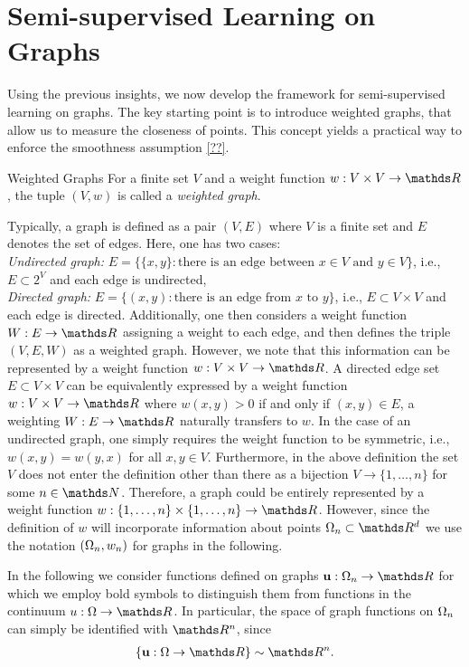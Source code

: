 \section{Semi-supervised Learning on Graphs}\label{sec:SSL_Graphs}
%
Using the previous insights, we now develop the framework for semi-supervised 
learning on graphs. The key starting point is to introduce weighted graphs, that allow 
us to measure the closeness of points. This concept yields a practical way to 
enforce the smoothness assumption \cref{??}.
%
\begin{definition}{Weighted Graphs}{}
For a finite set $V$ and a weight function $w:V\times V\to\R$, the tuple $(V,w)$ is called a \emph{weighted graph}.
\end{definition}
%
\begin{remark}{}{}
Typically, a graph is defined as a pair $(V,E)$ where $V$ is a finite set and $E$ denotes the set of edges. Here, 
one has two cases:\\
\emph{Undirected graph:} $E=\{ \{x,y\}: \text{there is an edge between } x\in V \text{ and } y\in V\}$, i.e., 
$E\subset 2^V$ and each edge is undirected,\\
%
\emph{Directed graph:} $E=\{ (x,y): \text{there is an edge from } x \text{ to } y\}$, i.e.,
$E\subset V\times V$ and each edge is directed.
%
Additionally, one then considers a weight function $W:E\to\R$ assigning a weight to each edge, and then defines 
the triple $(V,E,W)$ as a weighted graph. However, we note that this information can be represented by a 
weight function $w:V\times V\to\R$. A directed edge set $E\subset V\times V$ can be equivalently expressed by 
a weight function $w:V\times V\to\R$ where $w(x,y)>0$ if and only if $(x,y)\in E$, a weighting $W:E\to\R$ 
naturally transfers to $w$. In the case of an undirected graph, one simply requires the weight function to be symmetric, i.e., 
$w(x,y)=w(y,x)$ for all $x,y\in V$.
%
Furthermore, in the above definition the set $V$ does not enter the definition other than there as a bijection 
$V\to \{1,\ldots,n\}$ for some $n\in \N$. Therefore, a graph could be entirely represented by a weight function 
$w:\{1,\ldots,n\}\times\{1,\ldots,n\}\to\R$. However, since the definition of $w$ will incorporate information
about points $\domain_n\subset\R^d$ we use the notation $(\Omega_n, w_n)$ for graphs in the following.
\end{remark}
%
%
In the following we consider functions defined on graphs $\vec{u}:\domain_n\to\R$ for which we employ bold symbols to 
distinguish them from functions in the continuum $u:\domain\to\R$. In particular, the space of graph functions on $\Omega_n$ can 
simply be identified with $\R^n$, since 
%
\begin{align*}
\{\vec u:\domain\to\R\} \sim \R^n.
\end{align*}
%
%
